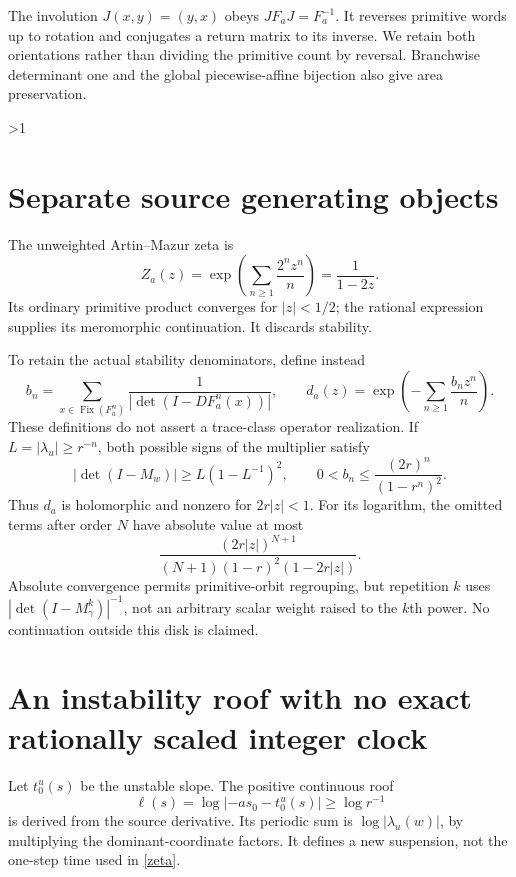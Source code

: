 \documentclass[10pt]{article}
\newcommand{\Fix}{\operatorname{Fix}}
\begin{document}
The involution $J(x,y)=(y,x)$ obeys $JF_aJ=F_a^{-1}$.
It reverses primitive words up to rotation and conjugates a return matrix
to its inverse. We retain both orientations rather than dividing the
primitive count by reversal. Branchwise determinant one and the global
piecewise-affine bijection also give area preservation.
\fi

\ifnum\CRevisionRound>1
\section{Separate source generating objects}
The unweighted Artin--Mazur zeta is
\begin{equation}\label{zeta}
 Z_a(z)=\exp\left(\sum_{n\ge1}\frac{2^n z^n}{n}\right)
       =\frac1{1-2z}.
\end{equation}
Its ordinary primitive product converges for $|z|<1/2$; the rational
expression supplies its meromorphic continuation. It discards stability.

To retain the actual stability denominators, define instead
\[
 b_n=\sum_{x\in\Fix(F_a^n)}
      \frac1{|\det(I-DF_a^n(x))|},\qquad
 d_a(z)=\exp\left(-\sum_{n\ge1}\frac{b_nz^n}{n}\right).
\]
These definitions do not assert a trace-class operator realization.
If $L=|\lambda_u|\ge r^{-n}$, both possible signs of the multiplier satisfy
\[
 |\det(I-M_w)|\ge L(1-L^{-1})^2,\qquad
 0<b_n\le\frac{(2r)^n}{(1-r^n)^2}.
\]
Thus $d_a$ is holomorphic and nonzero for $2r|z|<1$. For its logarithm,
the omitted terms after order $N$ have absolute value at most
\begin{equation}\label{tail}
 \frac{(2r|z|)^{N+1}}{(N+1)(1-r)^2(1-2r|z|)}.
\end{equation}
Absolute convergence permits primitive-orbit regrouping, but repetition
$k$ uses $|\det(I-M_\gamma^k)|^{-1}$, not an arbitrary scalar weight
raised to the $k$th power. No continuation outside this disk is claimed.

\section{An instability roof with no exact rationally scaled integer clock}
Let $t_0^u(s)$ be the unstable slope. The positive continuous roof
\[
 \ell(s)=\log|-as_0-t_0^u(s)|\ge\log r^{-1}
\]
is derived from the source derivative. Its periodic sum is
$\log|\lambda_u(w)|$, by multiplying the dominant-coordinate factors.
It defines a new suspension, not the one-step time used in \eqref{zeta}.
\end{document}
